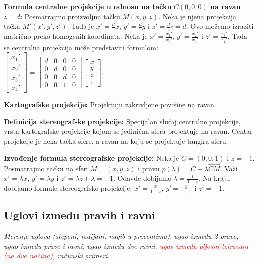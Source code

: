 \documentclass[12pt]{article}
\newcommand{\vek}[1]{\overrightarrow{#1}}
\newcommand{\ocena}[1]{\textcolor{red}{#1}}
\begin{document}
\textbf{Formula centralne projekcije u odnosu na tačku $C(0,0,0)$ na ravan
    $z=d$:} Posmatrajmo proizvoljnu tačku $M(x,y,z)$. Neka je njena projekcija
tačka $M'(x',y',z')$. Tada je $x'=\frac{d}{z}x$, $y'=\frac{d}{z}y$
i $z'=\frac{d}{z}z=d$. Ovo možemo izraziti matrično preko homogenih
koordinata. Neka je $x'=\frac{x_1'}{x_4'}$, $y'=\frac{x_2'}{x_4'}$ i
$z'=\frac{x_3'}{x_4'}$. Tada se centralna projekcija može predstaviti formulom:
$\begin{bmatrix}
        x_1' \\
        x_2' \\
        x_3' \\
        x_4'
    \end{bmatrix}=\begin{bmatrix}
        d & 0 & 0 & 0 \\
        0 & d & 0 & 0 \\
        0 & 0 & d & 0 \\
        0 & 0 & 1 & 0
    \end{bmatrix}\begin{bmatrix}
        x \\
        y \\
        z \\
        1
    \end{bmatrix}$.
\par

\textbf{Kartografske projekcije:} Projektuju zakrivljene površine na ravan.
\par

\textbf{Definicija stereografske projekcije:} Specijalan slučaj centralne projekcije,
vrsta kartografske projekcije kojom se jedinična sfera projektuje na ravan.
Centar projekcije je neka tačka sfere, a ravan na koju se projektuje tangira
sferu.
\par

\textbf{Izvođenje formula stereografske projekcije:} Neka je $C=(0,0,1)$ i
$z=-1$. Posmatrajmo tačku na sferi $M=(x,y,z)$ i pravu
$p(\lambda)=C+\lambda\vek{CM}$. Važi $x'=\lambda x$, $y'=\lambda y$ i
$z'=\lambda z+\lambda=-1$. Odavde dobijamo $\lambda=\frac{1}{1-z}$. Na kraju
dobijamo formule stereografske projekcije: $x'=\frac{x}{1-z}$,
$y'=\frac{y}{1-z}$ i $z'=-1$.


\subsection{Uglovi između pravih i ravni}
\textit{Merenje uglova (stepeni, radijani, nagib u procentima), ugao između 2
    prave, ugao između prave i ravni, ugao između dve ravni, \ocena{ugao između
        pljosni tetraedra (na dva načina)}, računski primeri.}
\par
\vspace*{1cm}
\end{document}
